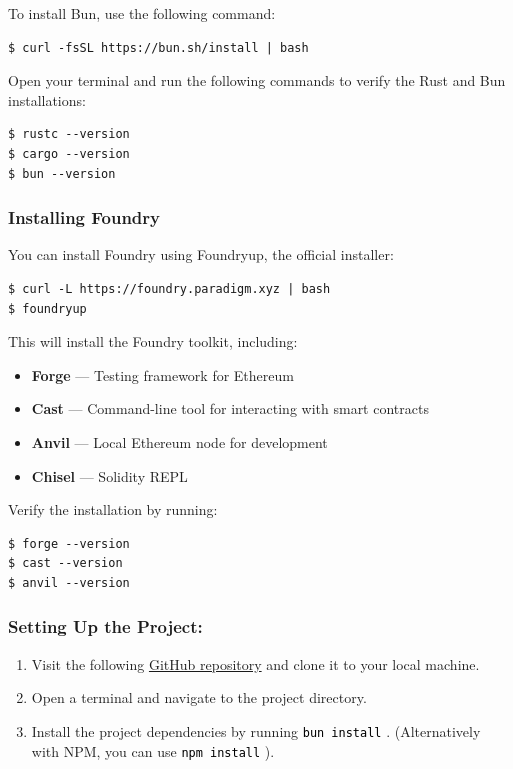 \documentclass[12pt]{article}
\newcommand{\codegrey}[1]{%
  \texttt{\colorbox{black!4}{\textcolor{black}{#1}}}%
}
\begin{document}
\noindent
To install Bun, use the following command:
\begin{verbatim}
$ curl -fsSL https://bun.sh/install | bash
\end{verbatim}

\noindent
Open your terminal and run the following commands to verify the Rust and Bun installations:

\begin{verbatim}
$ rustc --version
$ cargo --version
$ bun --version
\end{verbatim}

\subsubsection*{Installing Foundry}
You can install Foundry using Foundryup, the official installer:

\begin{verbatim}
$ curl -L https://foundry.paradigm.xyz | bash
$ foundryup
\end{verbatim}

\noindent
This will install the Foundry toolkit, including:
\begin{itemize}
    \item \textbf{Forge} --- Testing framework for Ethereum
    \item \textbf{Cast} --- Command-line tool for interacting with smart contracts
    \item \textbf{Anvil} --- Local Ethereum node for development
    \item \textbf{Chisel} --- Solidity REPL
\end{itemize}

\noindent
Verify the installation by running:

\begin{verbatim}
$ forge --version
$ cast --version
$ anvil --version
\end{verbatim}

\subsubsection*{Setting Up the Project:}

\begin{enumerate}
    \item Visit the following
          \href{https://github.com/radovluk/Smart-Contract-Exercise/tree/main/09-Vulnerabilities-Detection/task/task-code}{GitHub
          repository} and clone it to your local machine.
    \item Open a terminal and navigate to the project directory.
    \item Install the project dependencies by running \codegrey{bun install}. (Alternatively with NPM, you can use \codegrey{npm install}).
\end{enumerate}
\end{document}
